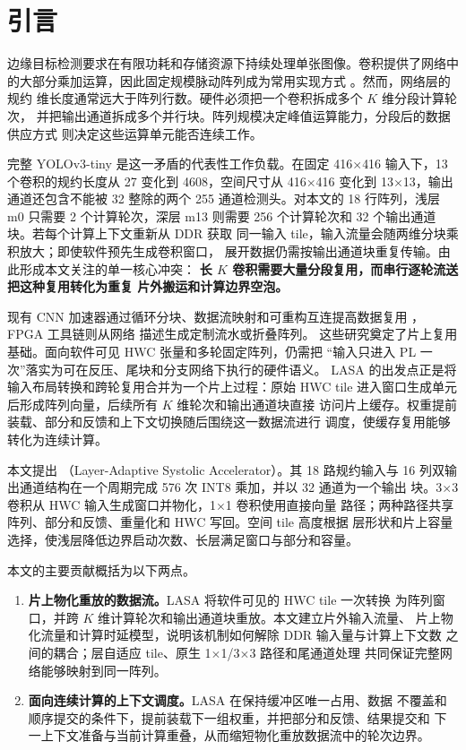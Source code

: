 \section{引言}
\label{sec:introduction}

边缘目标检测要求在有限功耗和存储资源下持续处理单张图像。卷积提供了网络中
的大部分乘加运算，因此固定规模脉动阵列成为常用实现方式
\cite{kung1982systolic,zhang2015optimizing,qiu2016going}。然而，网络层的规约
维长度通常远大于阵列行数。硬件必须把一个卷积拆成多个 $K$ 维分段计算轮次，
并把输出通道拆成多个并行块。阵列规模决定峰值运算能力，分段后的数据供应方式
则决定这些运算单元能否连续工作。

完整 YOLOv3-tiny 是这一矛盾的代表性工作负载\cite{yolov3}。在固定
416$\times$416 输入下，13 个卷积的规约长度从 27 变化到 4608，空间尺寸从
416$\times$416 变化到 13$\times$13，输出通道还包含不能被 32 整除的两个
255 通道检测头。对本文的 18 行阵列，浅层 m0 只需要 2 个计算轮次，深层 m13
则需要 256 个计算轮次和 32 个输出通道块。若每个计算上下文重新从 DDR 获取
同一输入 tile，输入流量会随两维分块乘积放大；即使软件预先生成卷积窗口，
展开数据仍需按输出通道块重复传输。由此形成本文关注的单一核心冲突：
\textbf{长 $K$ 卷积需要大量分段复用，而串行逐轮流送把这种复用转化为重复
片外搬运和计算边界空泡。}

现有 CNN 加速器通过循环分块、数据流映射和可重构互连提高数据复用
\cite{chen2016eyeriss,eyerissv2,maeri2018,simba2019}，FPGA 工具链则从网络
描述生成定制流水或折叠阵列\cite{fpgaConvNet2015,finn2017,dnnBuilder2018}。
这些研究奠定了片上复用基础。面向软件可见 HWC 张量和多轮固定阵列，仍需把
“输入只进入 PL 一次”落实为可在反压、尾块和分支网络下执行的硬件语义。
LASA 的出发点正是将输入布局转换和跨轮复用合并为一个片上过程：原始 HWC
tile 进入窗口生成单元后形成阵列向量，后续所有 $K$ 维轮次和输出通道块直接
访问片上缓存。权重提前装载、部分和反馈和上下文切换随后围绕这一数据流进行
调度，使缓存复用能够转化为连续计算。

本文提出 \LASA（Layer-Adaptive Systolic Accelerator）。其 18 路规约输入与
16 列双输出通道结构在一个周期完成 576 次 INT8 乘加，并以 32 通道为一个输出
块。3$\times$3 卷积从 HWC 输入生成窗口并物化，1$\times$1 卷积使用直接向量
路径；两种路径共享阵列、部分和反馈、重量化和 HWC 写回。空间 tile 高度根据
层形状和片上容量选择，使浅层降低边界启动次数、长层满足窗口与部分和容量。

本文的主要贡献概括为以下两点。

\begin{enumerate}[leftmargin=2.1em]
  \item \textbf{片上物化重放的数据流。}LASA 将软件可见的 HWC tile 一次转换
  为阵列窗口，并跨 $K$ 维计算轮次和输出通道块重放。本文建立片外输入流量、
  片上物化流量和计算时延模型，说明该机制如何解除 DDR 输入量与计算上下文数
  之间的耦合；层自适应 tile、原生 1$\times$1/3$\times$3 路径和尾通道处理
  共同保证完整网络能够映射到同一阵列。
  \item \textbf{面向连续计算的上下文调度。}LASA 在保持缓冲区唯一占用、数据
  不覆盖和顺序提交的条件下，提前装载下一组权重，并把部分和反馈、结果提交和
  下一上下文准备与当前计算重叠，从而缩短物化重放数据流中的轮次边界。
\end{enumerate}

